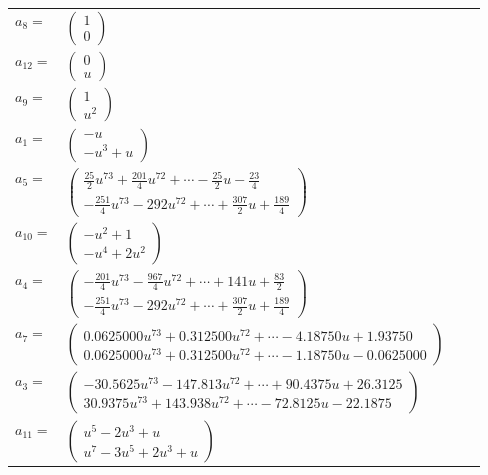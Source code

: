 \documentclass[1p]{elsarticle_modified}
\theoremstyle{definition}
\begin{document}
\begin{tabular}{m{7pt} m{180pt} m{7pt} m{180pt} }
\flushright $a_{8}=$&$\begin{pmatrix}1\\0\end{pmatrix}$ \\
\flushright $a_{12}=$&$\begin{pmatrix}0\\u\end{pmatrix}$ \\
\flushright $a_{9}=$&$\begin{pmatrix}1\\u^2\end{pmatrix}$ \\
\flushright $a_{1}=$&$\begin{pmatrix}- u\\- u^3+u\end{pmatrix}$ \\
\flushright $a_{5}=$&$\begin{pmatrix}\frac{25}{2} u^{73}+\frac{201}{4} u^{72}+\cdots-\frac{25}{2} u-\frac{23}{4}\\-\frac{251}{4} u^{73}-292 u^{72}+\cdots+\frac{307}{2} u+\frac{189}{4}\end{pmatrix}$ \\
\flushright $a_{10}=$&$\begin{pmatrix}- u^2+1\\- u^4+2 u^2\end{pmatrix}$ \\
\flushright $a_{4}=$&$\begin{pmatrix}-\frac{201}{4} u^{73}-\frac{967}{4} u^{72}+\cdots+141 u+\frac{83}{2}\\-\frac{251}{4} u^{73}-292 u^{72}+\cdots+\frac{307}{2} u+\frac{189}{4}\end{pmatrix}$ \\
\flushright $a_{7}=$&$\begin{pmatrix}0.0625000 u^{73}+0.312500 u^{72}+\cdots-4.18750 u+1.93750\\0.0625000 u^{73}+0.312500 u^{72}+\cdots-1.18750 u-0.0625000\end{pmatrix}$ \\
\flushright $a_{3}=$&$\begin{pmatrix}-30.5625 u^{73}-147.813 u^{72}+\cdots+90.4375 u+26.3125\\30.9375 u^{73}+143.938 u^{72}+\cdots-72.8125 u-22.1875\end{pmatrix}$ \\
\flushright $a_{11}=$&$\begin{pmatrix}u^5-2 u^3+u\\u^7-3 u^5+2 u^3+u\end{pmatrix}$ \\

\end{tabular}
\end{document}
